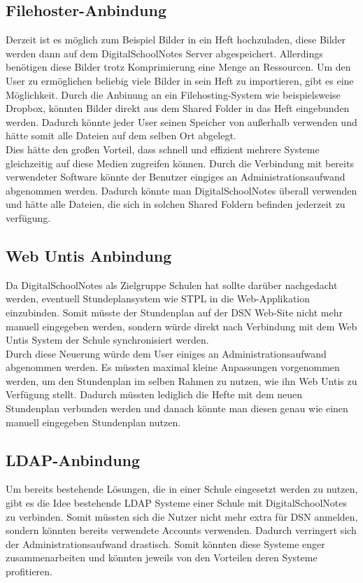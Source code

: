 \subsection{Filehoster-Anbindung}
Derzeit ist es möglich zum Beispiel Bilder in ein Heft hochzuladen, diese Bilder werden dann auf dem DigitalSchoolNotes Server abgespeichert. Allerdings benötigen diese Bilder trotz Komprimierung eine Menge an Ressourcen. Um den User zu ermöglichen beliebig viele Bilder in sein Heft zu importieren, gibt es eine Möglichkeit. Durch die Anbinung an ein Filehosting-System wie beispielsweise Dropbox, könnten Bilder direkt aus dem Shared Folder in das Heft eingebunden werden. Dadurch könnte jeder User seinen Speicher von außerhalb verwenden und hätte somit alle Dateien auf dem selben Ort abgelegt.\\
Dies hätte den großen Vorteil, dass schnell und effizient mehrere Systeme gleichzeitig auf diese Medien zugreifen können. Durch die Verbindung mit bereits verwendeter Software könnte der Benutzer eingiges an Administrationsaufwand abgenommen werden. Dadurch könnte man DigitalSchoolNotes überall verwenden und hätte alle Dateien, die sich in solchen Shared Foldern befinden jederzeit zu verfügung. 
\subsection{Web Untis Anbindung}
Da DigitalSchoolNotes als Zielgruppe Schulen hat sollte darüber nachgedacht werden, eventuell Stundeplansystem wie STPL in die Web-Applikation einzubinden. Somit müsste der Stundenplan auf der DSN Web-Site nicht mehr manuell eingegeben werden, sondern würde direkt nach Verbindung mit dem Web Untis System der Schule synchronisiert werden.\\
Durch diese Neuerung würde dem User einiges an Administrationsaufwand abgenommen werden. Es müssten maximal kleine Anpassungen vorgenommen werden, um den Stundenplan im selben Rahmen zu nutzen, wie ihn Web Untis zu Verfügung stellt. Dadurch müssten lediglich die Hefte mit dem neuen Stundenplan verbunden werden und danach könnte man diesen genau wie einen manuell eingegeben Stundenplan nutzen. 
\subsection{LDAP-Anbindung}
Um bereits bestehende Lösungen, die in einer Schule eingesetzt werden zu nutzen, gibt es die Idee bestehende LDAP Systeme einer Schule mit DigitalSchoolNotes zu verbinden. Somit müssten sich die Nutzer nicht mehr extra für DSN anmelden, sondern könnten bereits verwendete Accounts verwenden. Dadurch verringert sich der Administrationsaufwand drastisch. Somit könnten diese Systeme enger zusammenarbeiten und könnten jeweils von den Vorteilen deren Systeme profitieren. 

